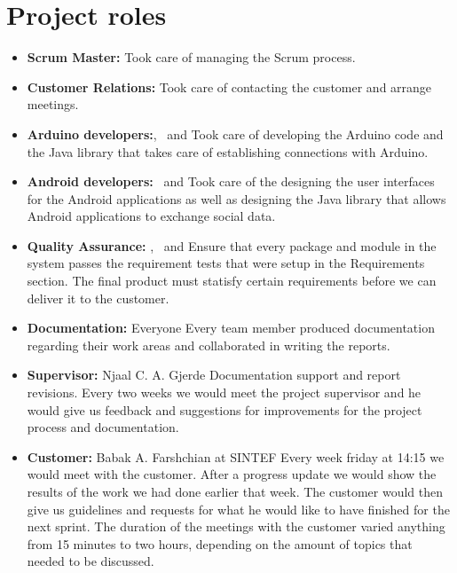 \section{Project roles}
\begin{itemize}
	\item \textbf{Scrum Master:} \henrik\newline
		Took care of managing the Scrum process.
	
	\item \textbf{Customer Relations:} \henrik\newline
		Took care of contacting the customer and arrange meetings.

	\item \textbf{Arduino developers:}\anders, \bjornar ~and \johan\newline
		Took care of developing the Arduino code and the Java library that takes
		care of establishing connections with Arduino.

	\item \textbf{Android developers:}  \emanuele~and \henrik\newline
		Took care of the designing the user interfaces for the Android applications
		as well as designing the Java library that allows Android applications
		to exchange social data.
	
	\item \textbf{Quality Assurance:} \johan, \asbjorn~and \jonas\newline
		Ensure that every package and module in the system passes the requirement tests
		that were setup in the Requirements section. The final product must statisfy certain
		requirements before we can deliver it to the customer.

	\item \textbf{Documentation:} Everyone\newline
		Every team member produced documentation regarding their work areas and
		collaborated in writing the reports.

	\item \textbf{Supervisor:} Njaal C. A. Gjerde\newline
		Documentation support and report revisions. Every two weeks we would meet the project supervisor
	 	and he would give us feedback and suggestions for improvements for the project process and documentation.

	\item \textbf{Customer:} Babak A. Farshchian at SINTEF \newline
		Every week friday at 14:15 we would meet with the customer. After a progress update we would show the results
		of the work we had done earlier that week. The customer would then give us guidelines and requests for what
		he would like to have finished for the next sprint. The duration of the meetings with the customer varied anything
		from 15 minutes to two hours, depending on the amount of topics that needed to be discussed.
\end{itemize}

